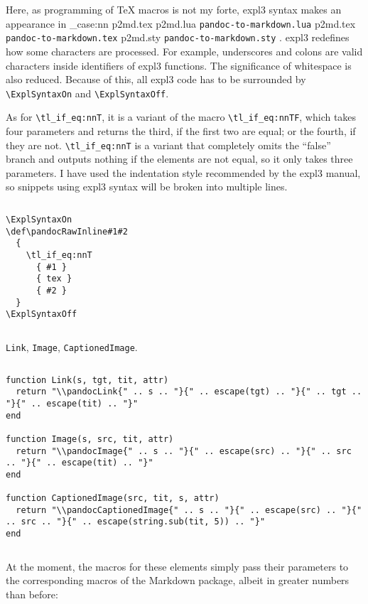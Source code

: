 \documentclass[
  digital,     %
  oneside,     %
  nosansbold,  %
  nocolorbold, %
  lof,         %
  nolot,       %
]{fithesis4}
\newcommand\macro[1]{\texttt{\textbackslash{}{#1}}}
\newcommand\file[1]
  {
    \str_case:nn
      { #1 }
      {
        { p2md.lua } { \texttt{pandoc\hyp{}to\hyp{}markdown.lua} }
        { p2md.tex } { \texttt{pandoc\hyp{}to\hyp{}markdown.tex} }
        { p2md.sty } { \texttt{pandoc\hyp{}to\hyp{}markdown.sty} }
      }
  }
\begin{document}
Here, as programming of \TeX{} macros is not my forte, expl3 syntax makes an appearance in \file{p2md.tex}. expl3 redefines how some characters are processed. For example, underscores and colons are valid characters inside identifiers of expl3 functions. The significance of whitespace is also reduced. Because of this, all expl3 code has to be surrounded by \macro{ExplSyntaxOn} and \macro{ExplSyntaxOff}.

As for \macro{tl\_if\_eq:nnT}, it is a variant of the macro \macro{tl\_if\_eq:nnTF}, which takes four parameters and returns the third, if the first two are equal; or the fourth, if they are not. \macro{tl\_if\_eq:nnT} is a variant that completely omits the ``false'' branch and outputs nothing if the elements are not equal, so it only takes three parameters. I have used the indentation style recommended by the expl3 manual, so snippets using expl3 syntax will be broken into multiple lines.

$ $

\noindent
\lstset{language=[plain]TeX}
\begin{lstlisting}
\ExplSyntaxOn
\def\pandocRawInline#1#2
  {
    \tl_if_eq:nnT
      { #1 }
      { tex }
      { #2 }
  }
\ExplSyntaxOff
\end{lstlisting}

$ $

\noindent
\texttt{Link}, \texttt{Image}, \texttt{CaptionedImage}.

$ $

\noindent
\lstset{language=[5.3]Lua}
\begin{lstlisting}
function Link(s, tgt, tit, attr)
  return "\\pandocLink{" .. s .. "}{" .. escape(tgt) .. "}{" .. tgt .. "}{" .. escape(tit) .. "}"
end

function Image(s, src, tit, attr)
  return "\\pandocImage{" .. s .. "}{" .. escape(src) .. "}{" .. src .. "}{" .. escape(tit) .. "}"
end

function CaptionedImage(src, tit, s, attr)
  return "\\pandocCaptionedImage{" .. s .. "}{" .. escape(src) .. "}{" .. src .. "}{" .. escape(string.sub(tit, 5)) .. "}"
end
\end{lstlisting}

$ $

\noindent
At the moment, the macros for these elements simply pass their parameters to the corresponding macros of the Markdown package, albeit in greater numbers than before:
\end{document}
